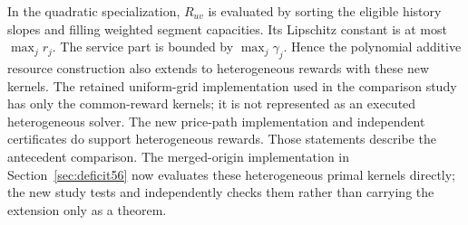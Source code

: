 In the quadratic specialization, $R_{uv}$ is evaluated by sorting the eligible history slopes and filling weighted segment capacities. Its Lipschitz constant is at most $\max_j r_j$. The service part is bounded by $\max_j\gamma_j$. Hence the polynomial additive resource construction also extends to heterogeneous rewards with these new kernels. The retained uniform-grid implementation used in the comparison study has only the common-reward kernels; it is not represented as an executed heterogeneous solver. The new price-path implementation and independent certificates do support heterogeneous rewards. Those statements describe the antecedent comparison. The merged-origin implementation in Section~\ref{sec:deficit56} now evaluates these heterogeneous primal kernels directly; the new study tests and independently checks them rather than carrying the extension only as a theorem.
